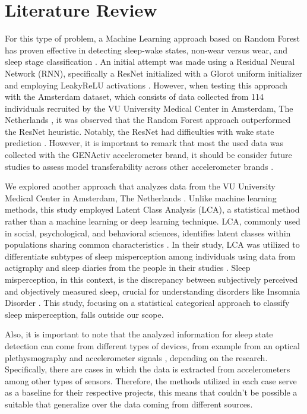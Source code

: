 \documentclass{article}
\begin{document}
\section{Literature Review}

For this type of problem, a Machine Learning approach based on Random Forest has proven effective in detecting sleep-wake states, non-wear versus wear, and sleep stage classification \cite{Sundararajan2021}. An initial attempt was made using a Residual Neural Network (RNN), specifically a ResNet initialized with a Glorot uniform initializer and employing LeakyReLU activations \cite{Sundararajan2021}. However, when testing this approach with the Amsterdam dataset, which consists of data collected from 114 individuals recruited by the VU University Medical Center in Amsterdam, The Netherlands \cite{teLindert2020}, it was observed that the Random Forest approach outperformed the ResNet heuristic. Notably, the ResNet had difficulties with wake state prediction \cite{Sundararajan2021}. However, it is important to remark that most the used data was collected with the GENActiv accelerometer brand, it should be consider future studies to assess model transferability across other accelerometer brands \cite{Sundararajan2021}.

We explored another approach that analyzes data from the VU University Medical Center in Amsterdam, The Netherlands \cite{teLindert2020}. Unlike machine learning methods, this study employed Latent Class Analysis (LCA), a statistical method rather than a machine learning or deep learning technique. LCA, commonly used in social, psychological, and behavioral sciences, identifies latent classes within populations sharing common characteristics \cite{qing2023}. In their study, LCA was utilized to differentiate subtypes of sleep misperception among individuals using data from actigraphy and sleep diaries from the people in their studies \cite{teLindert2020}. Sleep misperception, in this context, is the discrepancy between subjectively perceived and objectively measured sleep, crucial for understanding disorders like Insomnia Disorder \cite{teLindert2020}. This study, focusing on a statistical categorical approach to classify sleep misperception, falls outside our scope.

Also, it is important to note that the analyzed information for sleep state detection can come from different types of devices, from example from an optical plethysmography and accelerometer signals \cite{Beattie_2017} \cite{Fedorin2019}, depending on the research. Specifically, there are cases in which the data is extracted from accelerometers among other types of sensors. Therefore, the methods utilized in each case serve as a baseline for their respective projects, this means that couldn't be possible a suitable that generalize over the data coming from different sources.
\end{document}
